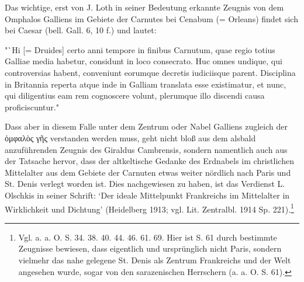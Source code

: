 \documentclass[a4paper, 11pt, oneside]{article}
\begin{document}
Das wichtige, erst von J. Loth in seiner Bedeutung erkannte Zeugnis von dem Omphalos Galliens im Gebiete der Carnutes bei Cenabum (= Orleans) findet sich bei Caesar (bell. Gall. 6, 10 f.) und lautet:

"`Hi [= Druides] certo anni tempore in finibus Carnutum, quae regio totius Galliae media habetur, considunt in loco consecrato. Huc omnes undique, qui controversias habent, conveniunt eorumque decretis iudiciisque parent. Disciplina in Britannia reperta atque inde in Galliam translata esse existimatur, et nunc, qui diligentius eam rem cognoscere volunt, plerumque illo discendi causa proficiscuntur."

Dass aber in diesem Falle unter dem Zentrum oder Nabel Galliens zugleich der ὀμφαλὸς γῆς verstanden werden muss, geht nicht bloß aus dem alsbald anzuführenden Zeugnis des Giraldus Cambrensis, sondern namentlich auch aus der Tatsache hervor, dass der altkeltische Gedanke des Erdnabels im christlichen Mittelalter aus dem Gebiete der Carnuten etwas weiter nördlich nach Paris und St. Denis verlegt worden ist. Dies nachgewiesen zu haben, ist das Verdienst L. Olschkis in seiner Schrift: `Der ideale Mittelpunkt Frankreichs im Mittelalter in Wirklichkeit und Dichtung' (Heidelberg 1913; vgl. Lit. Zentralbl. 1914 Sp. 221).\footnote{Vgl. a. a. O. S. 34. 38. 40. 44. 46. 61. 69. Hier ist S. 61 durch bestimmte Zeugnisse bewiesen, dass eigentlich und ursprünglich nicht Paris, sondern vielmehr das nahe gelegene St. Denis als Zentrum Frankreichs und der Welt angesehen wurde, sogar von den sarazenischen Herrschern (a. a. O. S. 61).}
\end{document}
